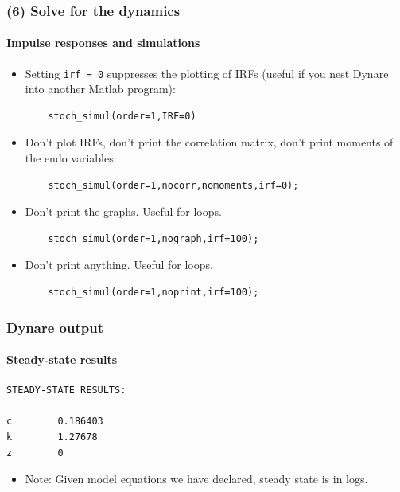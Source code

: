 \documentclass{beamer}
\begin{document}
\begin{frame}[fragile]
\frametitle{(6) Solve for the dynamics}
\framesubtitle{Impulse responses and simulations}
\begin{itemize}
	\item Setting \texttt{irf = 0} suppresses the plotting of IRFs (useful if you nest Dynare into another Matlab program):
	
	\begin{verbatim}
	stoch_simul(order=1,IRF=0)
	\end{verbatim}
	
	\item Don't plot IRFs, don't print the correlation matrix, don't print moments of the endo variables:
	
	\begin{verbatim}
	stoch_simul(order=1,nocorr,nomoments,irf=0);
	\end{verbatim}
	
	\item Don't print the graphs. Useful for loops.
	
	\begin{verbatim}
	stoch_simul(order=1,nograph,irf=100);
	\end{verbatim}
	
	\item Don't print anything. Useful for loops.
	
	\begin{verbatim}
	stoch_simul(order=1,noprint,irf=100);
	\end{verbatim}
	
\end{itemize}
\end{frame}

\begin{frame}[fragile]
\frametitle{Dynare output}
\framesubtitle{Steady-state results}

\begin{verbatim}
STEADY-STATE RESULTS:

c 		 0.186403
k 		 1.27678
z 		 0
\end{verbatim}
\begin{itemize}
	\item Note: Given model equations we have declared, steady state is in logs.
\end{itemize}
\end{frame}
\end{document}
